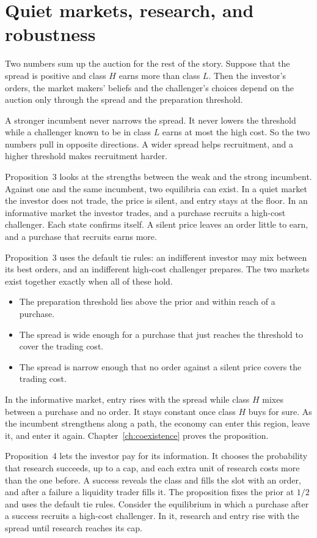 \section{Quiet markets, research, and robustness}\label{sec:story-markets}

Two numbers sum up the auction for the rest of the story. Suppose that the spread is positive and class \(H\) earns more than class \(L\). Then the investor's orders, the market makers' beliefs and the challenger's choices depend on the auction only through the spread and the preparation threshold.

A stronger incumbent never narrows the spread. It never lowers the threshold while a challenger known to be in class \(L\) earns at most the high cost. So the two numbers pull in opposite directions. A wider spread helps recruitment, and a higher threshold makes recruitment harder.

Proposition~3 looks at the strengths between the weak and the strong incumbent. Against one and the same incumbent, two equilibria can exist. In a quiet market the investor does not trade, the price is silent, and entry stays at the floor. In an informative market the investor trades, and a purchase recruits a high-cost challenger. Each state confirms itself. A silent price leaves an order little to earn, and a purchase that recruits earns more.

Proposition~3 uses the default tie rules: an indifferent investor may mix between its best orders, and an indifferent high-cost challenger prepares. The two markets exist together exactly when all of these hold.
\begin{itemize}
\item The preparation threshold lies above the prior and within reach of a purchase.
\item The spread is wide enough for a purchase that just reaches the threshold to cover the trading cost.
\item The spread is narrow enough that no order against a silent price covers the trading cost.
\end{itemize}
In the informative market, entry rises with the spread while class \(H\) mixes between a purchase and no order. It stays constant once class \(H\) buys for sure. As the incumbent strengthens along a path, the economy can enter this region, leave it, and enter it again. Chapter~\ref{ch:coexistence} proves the proposition.

Proposition~4 lets the investor pay for its information. It chooses the probability that research succeeds, up to a cap, and each extra unit of research costs more than the one before. A success reveals the class and fills the slot with an order, and after a failure a liquidity trader fills it. The proposition fixes the prior at \(1/2\) and uses the default tie rules. Consider the equilibrium in which a purchase after a success recruits a high-cost challenger. In it, research and entry rise with the spread until research reaches its cap.

